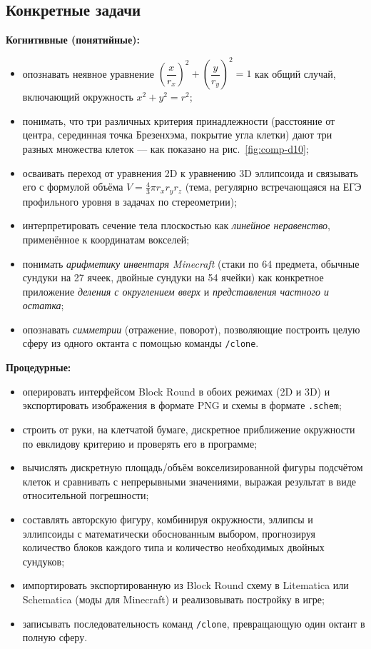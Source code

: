\documentclass[12pt,a4paper]{scrartcl}
\newcommand{\cmd}[1]{\textcolor{earth}{\texttt{\small #1}}}
\begin{document}
\subsection{Конкретные задачи}

\textbf{Когнитивные (понятийные):}
\begin{itemize}[leftmargin=1.3em,itemsep=0.2em,topsep=0.3em]
  \item опознавать неявное уравнение $\left(\dfrac{x}{r_x}\right)^{\!2} + \left(\dfrac{y}{r_y}\right)^{\!2} = 1$ как общий случай, включающий окружность $x^2 + y^2 = r^2$;
  \item понимать, что три различных критерия принадлежности (расстояние от центра, серединная точка Брезенхэма, покрытие угла клетки) дают три разных множества клеток --- как показано на рис.~\ref{fig:comp-d10};
  \item осваивать переход от уравнения 2D к уравнению 3D эллипсоида и связывать его с формулой объёма $V = \tfrac{4}{3}\pi r_x r_y r_z$ (тема, регулярно встречающаяся на ЕГЭ профильного уровня в задачах по стереометрии);
  \item интерпретировать сечение тела плоскостью как \emph{линейное неравенство}, применённое к координатам вокселей;
  \item понимать \emph{арифметику инвентаря Minecraft} (стаки по 64 предмета, обычные сундуки на 27 ячеек, двойные сундуки на 54 ячейки) как конкретное приложение \emph{деления с округлением вверх} и \emph{представления частного и остатка};
  \item опознавать \emph{симметрии} (отражение, поворот), позволяющие построить целую сферу из одного октанта с помощью команды \cmd{/clone}.
\end{itemize}

\textbf{Процедурные:}
\begin{itemize}[leftmargin=1.3em,itemsep=0.2em,topsep=0.3em]
  \item оперировать интерфейсом Block Round в обоих режимах (2D и 3D) и экспортировать изображения в формате PNG и схемы в формате \texttt{.schem};
  \item строить от руки, на клетчатой бумаге, дискретное приближение окружности по евклидову критерию и проверять его в программе;
  \item вычислять дискретную площадь/объём воксе\-лизированной фигуры подсчётом клеток и сравнивать с непрерывными значениями, выражая результат в виде относительной погрешности;
  \item составлять авторскую фигуру, комбинируя окружности, эллипсы и эллипсоиды с математически обоснованным выбором, прогнозируя количество блоков каждого типа и количество необходимых двойных сундуков;
  \item импортировать экспортированную из Block Round схему в Litematica или Schematica (моды для Minecraft) и реализовывать постройку в игре;
  \item записывать последовательность команд \cmd{/clone}, превращающую один октант в полную сферу.
\end{itemize}
\end{document}
